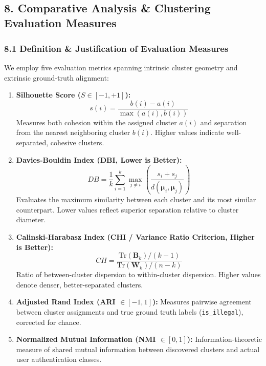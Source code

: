 \documentclass[11pt]{article}
\providecommand{\tightlist}{%
      \setlength{\itemsep}{0pt}\setlength{\parskip}{0pt}}
\begin{document}
    \begin{center}
    \end{center}
    { \hspace*{\fill} \\}
    
    \subsection{8. Comparative Analysis \& Clustering Evaluation
Measures}\label{comparative-analysis-clustering-evaluation-measures}

\subsubsection{8.1 Definition \& Justification of Evaluation
Measures}\label{definition-justification-of-evaluation-measures}

We employ five evaluation metrics spanning intrinsic cluster geometry
and extrinsic ground-truth alignment:

\begin{enumerate}
\def\labelenumi{\arabic{enumi}.}
\tightlist
\item
  \textbf{Silhouette Score (\(S \in [-1, +1]\)):}
  \[s(i) = \frac{b(i) - a(i)}{\max(a(i), b(i))}\] Measures both cohesion
  within the assigned cluster \(a(i)\) and separation from the nearest
  neighboring cluster \(b(i)\). Higher values indicate well-separated,
  cohesive clusters.
\item
  \textbf{Davies-Bouldin Index (DBI, Lower is Better):}
  \[DB = \frac{1}{k} \sum_{i=1}^k \max_{j \ne i} \left( \frac{s_i + s_j}{d(\boldsymbol{\mu}_i, \boldsymbol{\mu}_j)} \right)\]
  Evaluates the maximum similarity between each cluster and its most
  similar counterpart. Lower values reflect superior separation relative
  to cluster diameter.
\item
  \textbf{Calinski-Harabasz Index (CHI / Variance Ratio Criterion,
  Higher is Better):}
  \[CH = \frac{\text{Tr}(\mathbf{B}_k) / (k - 1)}{\text{Tr}(\mathbf{W}_k) / (n - k)}\]
  Ratio of between-cluster dispersion to within-cluster dispersion.
  Higher values denote denser, better-separated clusters.
\item
  \textbf{Adjusted Rand Index (ARI \(\in [-1, 1]\)):} Measures pairwise
  agreement between cluster assignments and true ground truth labels
  (\texttt{is\_illegal}), corrected for chance.
\item
  \textbf{Normalized Mutual Information (NMI \(\in [0, 1]\)):}
  Information-theoretic measure of shared mutual information between
  discovered clusters and actual user authentication classes.
\end{enumerate}
\end{document}

